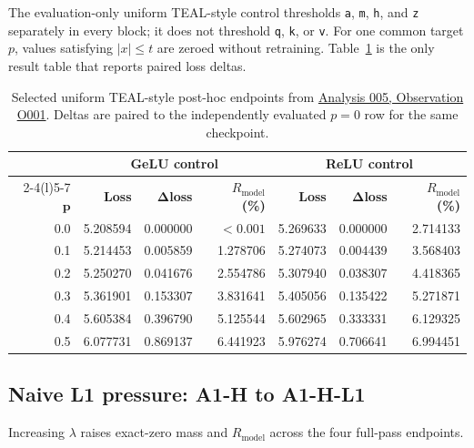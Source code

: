 \documentclass[10pt,a4paper]{article}
\newcommand{\Rmodel}{\ensuremath{R_{\mathrm{model}}}}
\newcommand{\code}[1]{\texttt{#1}}
\begin{document}
The evaluation-only uniform TEAL-style control thresholds \code{a}, \code{m}, \code{h}, and \code{z} separately in every block; it does not threshold \code{q}, \code{k}, or \code{v}. For one common target $p$, values satisfying $|x|\leq t$ are zeroed without retraining. Table~\ref{tab:teal-controls} is the only result table that reports paired loss deltas.

{\small
\begin{table}[htbp]
\centering
\caption{Selected uniform TEAL-style post-hoc endpoints from \href{../../../analyses/005-2026-08-30-run004-controls-teal-posthoc/observations/O001-r-model-vs-final-validation-loss.md}{Analysis 005, Observation O001}. Deltas are paired to the independently evaluated $p=0$ row for the same checkpoint.}
\label{tab:teal-controls}
\setlength{\tabcolsep}{3.2pt}
\begin{tabular*}{\textwidth}{@{\extracolsep{\fill}}r*{6}{r}@{}}
\toprule
& \multicolumn{3}{c}{\textbf{GeLU control}} & \multicolumn{3}{c}{\textbf{ReLU control}} \\
\cmidrule(lr){2-4}\cmidrule(l){5-7}
$\boldsymbol{p}$ & \textbf{Loss} & $\boldsymbol{\Delta}$\textbf{loss} & \textbf{\Rmodel{} (\%)} & \textbf{Loss} & $\boldsymbol{\Delta}$\textbf{loss} & \textbf{\Rmodel{} (\%)} \\
\midrule
0.0 & 5.208594 & 0.000000 & $<0.001$ & 5.269633 & 0.000000 & 2.714133 \\
0.1 & 5.214453 & 0.005859 & 1.278706 & 5.274073 & 0.004439 & 3.568403 \\
0.2 & 5.250270 & 0.041676 & 2.554786 & 5.307940 & 0.038307 & 4.418365 \\
0.3 & 5.361901 & 0.153307 & 3.831641 & 5.405056 & 0.135422 & 5.271871 \\
0.4 & 5.605384 & 0.396790 & 5.125544 & 5.602965 & 0.333331 & 6.129325 \\
0.5 & 6.077731 & 0.869137 & 6.441923 & 5.976274 & 0.706641 & 6.994451 \\
\bottomrule
\end{tabular*}
\end{table}}
\FloatBarrier

\subsection{Naive L1 pressure: A1-H to A1-H-L1}

Increasing $\lambda$ raises exact-zero mass and \Rmodel{} across the four full-pass endpoints.
\end{document}
